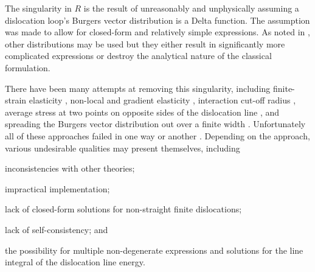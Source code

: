 The singularity in $ R $ is the result of unreasonably and unphysically assuming a dislocation loop's Burgers vector distribution is a Delta function. The assumption was made to allow for closed-form and relatively simple expressions. As noted in \cite{bv_dist}, other distributions may be used but they either result in significantly more complicated expressions or destroy the analytical nature of the classical formulation.

There have been many attempts at removing this singularity, including finite-strain elasticity \cite{non_sing3}, non-local and gradient elasticity \cite{non_sing1, non_sing2}, interaction cut-off radius \cite{pk_force}, average stress at two points on opposite sides of the dislocation line \cite{non_sing4, non_sing5}, and spreading the Burgers vector distribution out over a finite width \cite{bv_dist, non_sing6, non_sing7}. Unfortunately all of these approaches failed in one way or another \cite{a_non-singular_continuum_theory_of_dislocations}. Depending on the approach, various undesirable qualities may present themselves, including
\begin{inparaenum}
    \item inconsistencies with other theories;
    \item impractical implementation;
    \item lack of closed-form solutions for non-straight finite dislocations;
    \item lack of self-consistency; and
    \item the possibility for multiple non-degenerate expressions and solutions for the line integral of the dislocation line energy.
\end{inparaenum}

